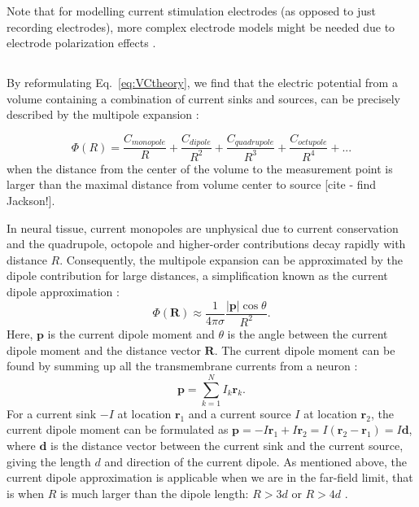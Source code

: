 Note that for modelling current stimulation electrodes (as opposed to just recording electrodes), more complex electrode models might be needed due to electrode polarization effects \citep{McIntyre2001, Martinsen2008, Joucla2012}.


\subsection{}
\label{sec:dipole}

By reformulating Eq.~\eqref{eq:VCtheory}, we find that the electric potential from a volume containing a combination of current sinks and sources, can be precisely described by the multipole expansion \citep{Nunez2006}:

\begin{equation}\label{eq:multipole}
\Phi(R) = \frac{C_{monopole}}{R} + \frac{C_{dipole}}{R^2} + \frac{C_{quadrupole}}{R^3} + \frac{C_{octupole}}{R^4} + ...
\end{equation}
when the distance from the center of the volume to the measurement point is larger than the maximal distance from volume center to source [cite - find Jackson!].

In neural tissue, current monopoles are unphysical due to current conservation and the quadrupole, octopole and higher-order contributions decay rapidly with distance $R$. Consequently, the multipole expansion can be approximated by the dipole contribution for large distances, a simplification known as the current dipole approximation \citep{Nunez2006}:
\begin{equation}\label{eq:CDA}
\Phi(\mathbf{R}) \approx \frac{1}{4 \pi \sigma} \frac{|\mathbf{p}| \cos \theta}{R^2}.
\end{equation}
Here, $\mathbf{p}$ is the current dipole moment and $\theta$ is the angle between the current dipole moment and the distance vector $\mathbf{R}$. The current dipole moment can be found by summing up all the transmembrane currents from a neuron \citep{Pettersen2008, Pettersen2014, Nunez2006}: 
\begin{equation}\label{eq:dipole}
\mathbf{p} = \sum_{k=1}^N I_k \mathbf{r}_k.
\end{equation}
For a current sink $-I$ at location $\mathbf{r}_1$ and a current source $I$ at location $\mathbf{r}_2$, the current dipole moment can be formulated as $\mathbf{p} = -I\mathbf{r}_1 + I\mathbf{r}_2 = I(\mathbf{r}_2 - \mathbf{r}_1) = I\mathbf{d}$, where $\mathbf{d}$ is the distance vector between the current sink and the current source, giving the length $d$ and direction of the current dipole. As mentioned above, the current dipole approximation is applicable when we are in the far-field limit, that is when $R$ is much larger than the dipole length: $R > 3d$ or $R > 4d$ \citep{Nunez2006}.

